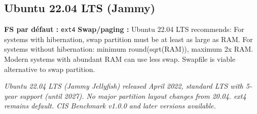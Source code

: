 \documentclass[10pt,a4paper]{article}
\begin{document}
\subsection{Ubuntu 22.04 LTS (Jammy)}
\noindent\small \textbf{FS par d\'efaut :} \texttt{ext4} \quad\textbullet\quad \textbf{Swap/paging :} Ubuntu 22.04 LTS recommends: For systems with hibernation, swap partition must be at least as large as RAM. For systems without hibernation: minimum round(sqrt(RAM)), maximum 2x RAM. Modern systems with abundant RAM can use less swap. Swapfile is viable alternative to swap partition.\normalsize\par\smallskip
\noindent\small\textit{Ubuntu 22.04 LTS (Jammy Jellyfish) released April 2022, standard LTS with 5-year support (until 2027). No major partition layout changes from 20.04. ext4 remains default. CIS Benchmark v1.0.0 and later versions available.}\normalsize\par\smallskip
\end{document}
